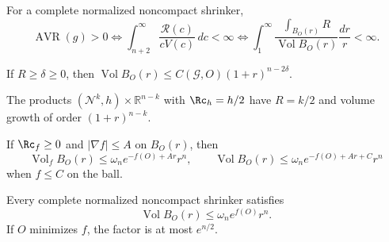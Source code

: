 \begin{proposition}
\label{prop:chow-iv-positive-avr}
For a complete normalized noncompact shrinker,
\[
\operatorname{AVR}(g)>0\iff
\int_{n+2}^{\infty}\frac{\mathcal R(c)}{cV(c)}\,dc<\infty
\iff
\int_1^\infty\frac{\int_{B_O(r)}R}{\operatorname{Vol}B_O(r)}\frac{dr}{r}<\infty.
\]
\end{proposition}

\begin{corollary}
\label{cor:chow-iv-volume-lower-scalar}
If $R\ge\delta\ge0$, then
$\operatorname{Vol}B_O(r)\le C(\mathcal G,O)(1+r)^{n-2\delta}$.
\end{corollary}

\begin{remark}
\label{rem:chow-iv-cylinder-shrinkers}
The products $(\mathcal N^k,h)\times\mathbb R^{n-k}$ with $\Rc_h=h/2$ have
$R=k/2$ and volume growth of order $(1+r)^{n-k}$.
\end{remark}

\begin{theorem}
\label{thm:chow-iv-bakry-emery-comparison}
If $\Rc_f\ge0$ and $|\nabla f|\le A$ on $B_O(r)$, then
\[
\operatorname{Vol}_fB_O(r)\le\omega_n e^{-f(O)+Ar}r^n,
\qquad
\operatorname{Vol}B_O(r)\le\omega_ne^{-f(O)+Ar+C}r^n
\]
when $f\le C$ on the ball.
\end{theorem}

\begin{theorem}
\label{thm:chow-iv-euclidean-volume-growth}
Every complete normalized noncompact shrinker satisfies
\[
\operatorname{Vol}B_O(r)\le\omega_ne^{f(O)}r^n.
\]
If $O$ minimizes $f$, the factor is at most $e^{n/2}$.
\end{theorem}

